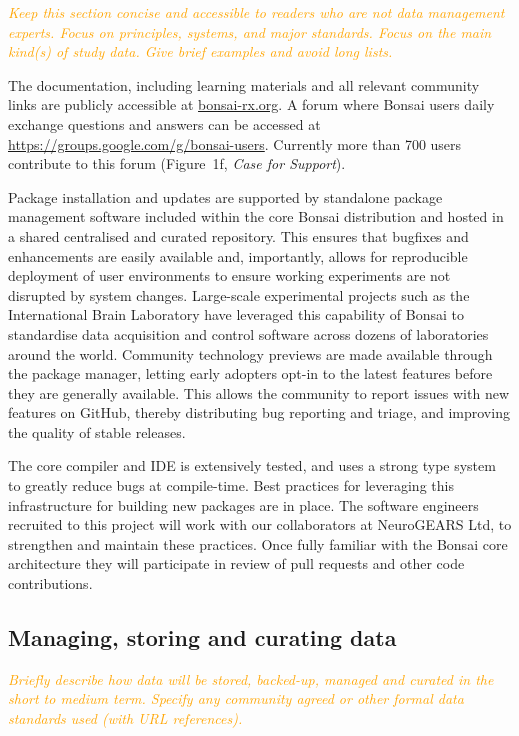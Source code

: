 \documentclass[a4paper,11pt]{article}
\begin{document}
\textcolor{orange}{\textit{Keep this section concise and accessible to readers who are not data management experts.  Focus on principles, systems, and major standards. Focus on the main kind(s) of study data.  Give brief examples and avoid long lists.}}

The documentation, including learning materials and all relevant community
links are publicly accessible at \url{bonsai-rx.org}. A forum where Bonsai
users daily exchange questions and answers can be accessed at
\url{https://groups.google.com/g/bonsai-users}. Currently more than 700 users
contribute to this forum (Figure~1f, \emph{Case for Support}).

Package installation and updates are supported by standalone package management
software included within the core Bonsai distribution and hosted in a shared
centralised and curated repository. This ensures that bugfixes and enhancements
are easily available and, importantly, allows for reproducible deployment of
user environments to ensure working experiments are not disrupted by system
changes.
%
Large-scale experimental projects such as the International Brain Laboratory
have leveraged this capability of Bonsai to standardise data acquisition and
control software across dozens of laboratories around the world.
%
Community technology previews are made available through the package manager,
letting early adopters opt-in to the latest features before they are generally
available. This allows the community to report issues with new features on
GitHub, thereby distributing bug reporting and triage, and improving the
quality of stable releases.

The core compiler and IDE is extensively tested, and uses a strong type system
to greatly reduce bugs at compile-time. Best practices for leveraging this
infrastructure for building new packages are in place. The software engineers
recruited to this project will work with our collaborators at NeuroGEARS Ltd,
to strengthen and maintain these practices. Once fully familiar with the Bonsai
core architecture they will participate in review of pull requests and other
code contributions.

\subsection{Managing, storing and curating data}

\textcolor{orange}{\textit{Briefly describe how data will be stored, backed-up, managed and curated in the short to medium term. Specify any community agreed or other formal data standards used (with URL references).}}
\end{document}
